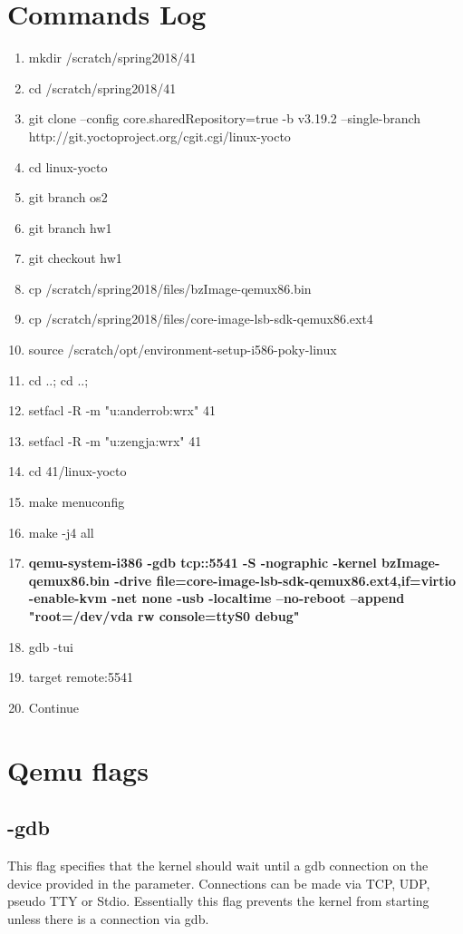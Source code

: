 \documentclass[draftclsnofoot, onecolumn, compsoc, 10pt]{IEEEtran}
\begin{document}
\section{Commands Log}
\begin{enumerate}
  \item mkdir /scratch/spring2018/41
	\item cd /scratch/spring2018/41

  \item git clone --config core.sharedRepository=true -b v3.19.2 --single-branch http://git.yoctoproject.org/cgit.cgi/linux-yocto
  \item cd linux-yocto
	\item git branch os2
	\item git branch hw1
	\item git checkout hw1
  \item cp /scratch/spring2018/files/bzImage-qemux86.bin
  \item cp /scratch/spring2018/files/core-image-lsb-sdk-qemux86.ext4
	\item source /scratch/opt/environment-setup-i586-poky-linux
	
	\item cd ..; cd ..;
	\item setfacl -R -m "u:anderrob:wrx" 41
	\item setfacl -R -m "u:zengja:wrx" 41
	\item cd 41/linux-yocto
	
  \item make menuconfig

  \item make -j4 all
  \item \textbf{qemu-system-i386 -gdb tcp::5541 -S -nographic -kernel bzImage-qemux86.bin -drive file=core-image-lsb-sdk-qemux86.ext4,if=virtio -enable-kvm -net none -usb -localtime --no-reboot --append "root=/dev/vda rw console=ttyS0 debug"}

  \item gdb -tui
  \item target remote:5541
  \item Continue
\end{enumerate}




\section{Qemu flags}

	\subsection{-gdb}
		This flag specifies that the kernel should wait until a gdb connection on the device provided in the parameter. Connections can be made via TCP, UDP, pseudo TTY or Stdio. Essentially this flag prevents the kernel from starting unless there is a connection via gdb.\\
\end{document}
